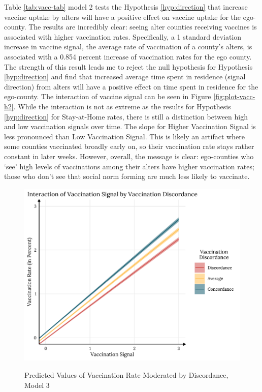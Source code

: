 Table \ref{tab:vacc-tab} model 2 tests the Hypothesis \ref{hyp:direction} that
increase vaccine uptake by alters will have a positive effect on vaccine uptake
for the ego-county. The results are incredibly clear: seeing alter counties
receiving vaccines is associated with higher vaccination rates. Specifically, a
1 standard deviation increase in vaccine signal, the average rate of vaccination
of a county's alters, is associated with a 0.854 percent increase of vaccination
rates for the ego county. The strength of this result leads me to reject the
null hypothesis for Hypothesis \ref{hyp:direction} and find that increased
average time spent in residence (signal direction) from alters will have a
positive effect on time spent in residence for the ego-county. The interaction
of vaccine signal can be seen in Figure \ref{fig:plot-vacc-h2}. While the
interaction is not as extreme as the results for Hypothesis \ref{hyp:direction}
for Stay-at-Home rates, there is still a distinction between high and low
vaccination signals over time. The slope for Higher Vaccination Signal is less
pronounced than Low Vaccination Signal. This is likely an artifact where some
counties vaccinated broadly early on, so their vaccination rate stays rather
constant in later weeks. However, overall, the message is clear: ego-counties
who `see' high levels of vaccinations among their alters have higher vaccination
rates; those who don't see that social norm forming are much less likely to
vaccinate.

\begin{figure}
{\centering \includegraphics[width=0.8\linewidth]{figs/paper3/plot-vacc-h3-1}}
\caption{Predicted Values of Vaccination Rate Moderated by Discordance, Model 3}\label{fig:plot-vacc-h3}
\end{figure}

